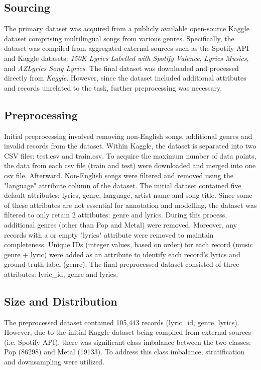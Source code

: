 \subsection{Sourcing}
The primary dataset was acquired from a publicly available open-source Kaggle dataset comprising multilingual songs from various genres. Specifically, the dataset was compiled from aggregated external sources such as the Spotify API and Kaggle datasets: \textit{150K Lyrics Labelled with Spotify Valence}, \textit{Lyrics Musics}, and \textit{AZLyrics Song Lyrics}. The final dataset was downloaded and processed directly from \textit{Kaggle}. However, since the dataset included additional attributes and records unrelated to the task, further preprocessing was necessary. 

\subsection{Preprocessing}
Initial preprocessing involved removing non-English songs, additional genres and invalid records from the dataset. Within Kaggle, the dataset is separated into two CSV files: test.csv and train.csv. To acquire the maximum  number of data points, the data from each csv file (train and test) were downloaded and merged into one csv file. Afterward. Non-English songs were filtered and removed using the "language" attribute column of the dataset. The initial dataset contained five default attributes: lyrics, genre, language, artist name and song title. Since some of these attributes are not essential for annotation and modelling, the dataset was filtered to only retain 2 attributes: genre and lyrics. During this process, additional genres (other than Pop and Metal) were removed. Moreover, any records with a or empty "lyrics" attribute were removed to maintain completeness. Unique IDs (integer values, based on order) for each record (music genre + lyric) were added as an attribute to identify each record's lyrics and ground-truth label (genre). The final preprocessed dataset consisted of three attributes:  lyric\_id, genre and lyrics. 

\subsection{Size and Distribution}
The preprocessed dataset contained 105,443 records (lyric\_id, genre, lyrics). However, due to the initial Kaggle dataset being compiled from external sources (i.e. Spotify API), there was significant class imbalance between the two classes: Pop (86298) and Metal (19133). To address this class imbalance, stratification and downsampling were utilized.

